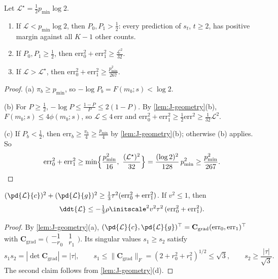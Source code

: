 \begin{lemma}
\label{lem:J-levels}
Let $\mathcal L^\star=\frac{1}{2}p_{\min}\log2$.
\begin{enumerate}[label=(\alph*),leftmargin=*,itemsep=2pt,topsep=3pt]
\item If $\mathcal L<p_{\min}\log2$, then $P_0,P_1>\frac{1}{2}$: every prediction of $s_t$, $t\ge2$, has positive margin against all $K-1$ other counts.
\item If $P_0,P_1\ge\frac{1}{2}$, then $\mathrm{err}_0^2+\mathrm{err}_1^2\ge \frac{\mathcal L^2}{32}$.
\item If $\mathcal L>\mathcal L^\star$, then $\mathrm{err}_0^2+\mathrm{err}_1^2\ge \frac{p_{\min}^2}{267}$.
\end{enumerate}
\end{lemma}

\begin{proof}
(a) $\pi_b\ge p_{\min}$, so $-\log P_b=F(m_b;s)<\log2$.

(b) For $P\ge\frac{1}{2}$, $-\log P\le\frac{1-P}{P}\le2(1-P)$. By \cref{lem:J-geometry}(b), $F(m_b;s)\le4\phi(m_b;s)$, so $\mathcal L\le4\,\mathrm{err}$ and
$\mathrm{err}_0^2+\mathrm{err}_1^2\ge\frac{1}{2}\mathrm{err}^2\ge\frac{1}{32}\mathcal L^2$.

(c) If $P_b<\frac{1}{2}$, then $\mathrm{err}_b\ge\frac{\pi_b}{4}\ge\frac{p_{\min}}{4}$ by \cref{lem:J-geometry}(b); otherwise (b) applies. So
\[
 \mathrm{err}_0^2+\mathrm{err}_1^2\ge\min\Bigl\{\frac{p_{\min}^2}{16},\ \frac{(\mathcal L^\star)^2}{32}\Bigr\}=\frac{(\log2)^2}{128}\,p_{\min}^2\ge\frac{p_{\min}^2}{267}.
\qedhere
\]
\end{proof}

\begin{lemma}
\label{lem:J-gradient}
$(\pd{\mathcal L}{c})^2+(\pd{\mathcal L}{g})^2\ge\frac{1}{3}\tau^2(\mathrm{err}_0^2+\mathrm{err}_1^2)$. If $v^2\le1$, then
\[
 \ddt{\mathcal L}\le-\tfrac{1}{3}\rho\initscale^2v^2\tau^2\,(\mathrm{err}_0^2+\mathrm{err}_1^2).
\]
\end{lemma}

\begin{proof}
By \cref{lem:J-geometry}(a), $(\pd{\mathcal L}{c},\pd{\mathcal L}{g})^\top=\mathbf C_{\mathrm{grad}}(\mathrm{err}_0,\mathrm{err}_1)^\top$ with $\mathbf C_{\mathrm{grad}}=\bigl(\begin{smallmatrix}-1&1\\-r_0&r_1\end{smallmatrix}\bigr)$. Its singular values $s_1\ge s_2$
satisfy
\[
 s_1s_2=|\det\mathbf C_{\mathrm{grad}}|=|\tau|,\qquad s_1\le\|\mathbf C_{\mathrm{grad}}\|_F=(2+r_0^2+r_1^2)^{1/2}\le\sqrt3,\qquad s_2\ge\frac{|\tau|}{\sqrt3} .
\]
The second claim follows from \cref{lem:J-geometry}(d).
\end{proof}

